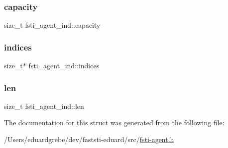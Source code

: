 \subsubsection{\texorpdfstring{capacity}{capacity}}
{\footnotesize\ttfamily size\+\_\+t fsti\+\_\+agent\+\_\+ind\+::capacity}

\mbox{\label{structfsti__agent__ind_a2892aba8fbb99f0ceb363c434c861e4f}} 
\subsubsection{\texorpdfstring{indices}{indices}}
{\footnotesize\ttfamily size\+\_\+t$\ast$ fsti\+\_\+agent\+\_\+ind\+::indices}

\mbox{\label{structfsti__agent__ind_aa1deb5291b58997006ed73cdfdacb946}} 
\subsubsection{\texorpdfstring{len}{len}}
{\footnotesize\ttfamily size\+\_\+t fsti\+\_\+agent\+\_\+ind\+::len}



The documentation for this struct was generated from the following file\+:\begin{DoxyCompactItemize}
\item 
/\+Users/eduardgrebe/dev/faststi-\/eduard/src/\mbox{\hyperlink{fsti-agent_8h}{fsti-\/agent.\+h}}\end{DoxyCompactItemize}
